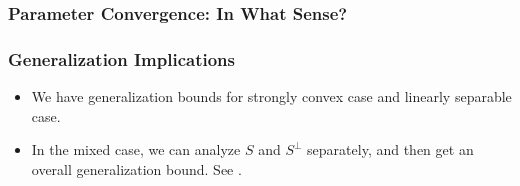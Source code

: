 \documentclass{beamer}
\begin{document}
\begin{frame}
\frametitle{Parameter Convergence: In What Sense?}
\end{frame}

\begin{frame}
\frametitle{Generalization Implications}
\begin{itemize}
    \item We have generalization bounds for strongly convex case and linearly separable case.
    \item In the mixed case, we can analyze $S$ and $S^{\perp}$ separately, and then get an overall generalization bound. See \cite{TDS15}.
\end{itemize}
\end{frame}
\end{document}

